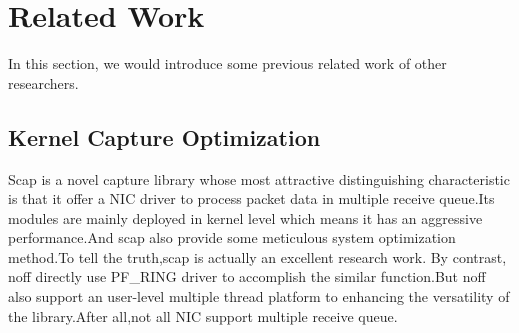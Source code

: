 \documentclass[conference]{IEEEtran}
\begin{document}
%



\section{Related Work}
In this section, we would introduce some previous related work of other researchers.

\subsection{Kernel Capture Optimization}
Scap is a novel capture library whose most attractive distinguishing characteristic is that it offer a NIC driver to process packet data in multiple receive queue.Its modules are mainly deployed in kernel level which means it has an aggressive performance.And scap also provide some  meticulous system optimization method.To tell the truth,scap is actually an excellent research work. By contrast, noff directly use PF\_RING driver to accomplish the similar function.But noff also support an user-level multiple thread platform to enhancing the versatility of the library.After all,not all NIC support multiple receive queue.
\end{document}

